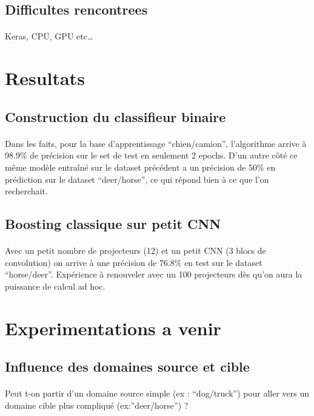 \documentclass[11 pt]{article}
\begin{document}
\subsection{Difficultes rencontrees}
\paragraph{}Keras, CPU, GPU etc\ldots

\section{Resultats}
\subsection{Construction du classifieur binaire}
\paragraph{}Dans les faits, pour la base d’apprentissage “chien/camion”, l’algorithme arrive à 98.9\% de précision sur le set de test en seulement 2 epochs. D’un autre côté ce même modèle entraîné sur le dataset précédent a un précision de 50\% en prédiction sur le dataset “deer/horse”, ce qui répond bien à ce que l’on recherchait.

\subsection{Boosting classique sur petit CNN}
\paragraph{}Avec un petit nombre de projecteurs (12) et un petit CNN (3 blocs de convolution) on arrive à une précision de 76.8\% en test sur le dataset “horse/deer”. Expérience à renouveler avec un 100 projecteurs dès qu’on aura la puissance de calcul ad hoc.

\section{Experimentations a venir}
\subsection{Influence des domaines source et cible}
\paragraph{}Peut t-on partir d’un domaine source simple (ex : “dog/truck”) pour aller vers un domaine cible plus compliqué (ex:”deer/horse”) ?
\end{document}
